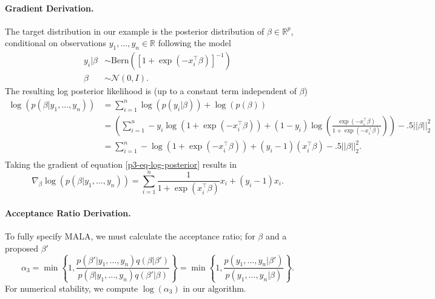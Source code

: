 \documentclass{article}
\begin{document}
\paragraph{Gradient Derivation.} 
The target distribution in our example is the posterior distribution of $\beta \in \mathbb{R}^p$, conditional
on observations $y_1,...,y_n \in \mathbb{R}$ following the model
\begin{align}
    y_i | \beta &\sim \text{Bern}(\left[ 1 + \exp(-x_i^\intercal \beta) \right]^{-1})\\
    \beta &\sim \mathcal{N}(0, I).
\end{align}
The resulting log posterior likelihood is (up to a constant term independent of $\beta$)
\begin{align} \label{p3-eq-log-posterior}
    \log ( p(\beta | y_1,...,y_n) ) &= \sum_{i=1}^n \log( p(y_i | \beta)) + \log(p(\beta))\\
    &= \left( 
        \sum_{i=1}^n -y_i \log(1+\exp(-x_i^\intercal \beta)) 
        + (1-y_i) \log\left( \frac{\exp(-x_i^\intercal\beta)}{1+\exp(-x_i^\intercal\beta)}\right) 
        \right) - .5 ||\beta||_2^2\\
    &= \sum_{i=1}^n -\log\left( 1+\exp(-x_i^\intercal\beta) \right) + (y_i-1)(x_i^\intercal \beta) - .5 ||\beta||_2^2. \\
\end{align} 
Taking the gradient of equation \ref{p3-eq-log-posterior} results in
\begin{equation}
    \nabla_{\beta} \log( p(\beta | y_1,...,y_n) ) = \sum_{i=1}^n \frac{1}{1 + \exp(x_i^\intercal\beta)} x_i + (y_i - 1) x_i.
\end{equation}

\paragraph{Acceptance Ratio Derivation.} 
To fully specify MALA, we must calculate the acceptance ratio; for $\beta$ and a proposed $\beta'$
\begin{equation} \label{p3-eq-acceptance-ratio}
    \alpha_3
    = \min\left\{1, \frac{p(\beta' | y_1,...,y_n) q(\beta | \beta')}{p(\beta | y_1,...,y_n) q(\beta' | \beta)} \right\} 
    = \min\left\{1, \frac{p(y_1,...,y_n | \beta')}{p(y_1,...,y_n | \beta)}\right\}.
\end{equation}
For numerical stability, we compute $\log(\alpha_3)$ in our algorithm.
\end{document}
